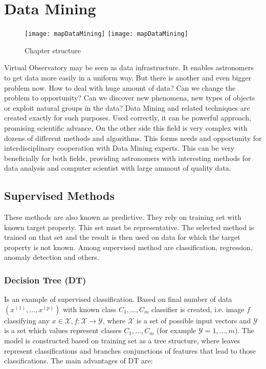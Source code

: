 \chapter{Data Mining}

\begin{figure}[!htbp]
  \begin{center}
    \leavevmode
    \ifpdf
    \texttt{[image: mapDataMining]}
    \else
    \texttt{[image: mapDataMining]}
    \fi
    \caption{Chapter structure}
    \label{FigStructure}
  \end{center}
\end{figure}

\label{chap:dataMining}
Virtual Observatory may be seen as data infrastructure. It enables
astronomers to get data more easily in a uniform way. But there is
another and even bigger problem now. How to deal with huge amount of
data? Can we change the problem to opportunity? Can we discover new
phenomena, new types of objects or exploit natural groups in the data?
Data Mining and related techniques are created exactly for such
purposes. Used correctly, it can be powerful approach, promising
scientific advance. On the other side this field is very complex with
dozens of different methods and algorithms. This forms needs and
opportunity for interdisciplinary cooperation with Data Mining
experts. This can be very beneficially for both fields, providing
astronomers with interesting methods for data analysis and computer
scientist with large ammout of quality data.

\section{Supervised Methods}
These methods are also known as predictive\citep{ball2010data}. They
rely on training set with known target property. This set must be
representative. The selected method is trained on that set and the
result is then used on data for which the target property is not
known. Among supervised method are classification, regression, anomaly
detection and others.

\subsection{Decision Tree (DT)}
Is an example of supervised classification. Based on final number of
data $(x^{(1)},\ldots,x^{(p)})$ with known class $C_1,\ldots, C_m$
classifier is created, i.e. image $f$ classifying any $x \in
\mathcal{X}, f:\mathcal{X}\rightarrow \mathcal{Y}$, where
$\mathcal{X}$ is a set of possible input vectors and $\mathcal{Y}$ is
a set which values represent classes $C_1,\ldots, C_m$ (for example
$\mathcal{Y} = {1,\ldots,m}$). The model is constructed based on
training set as a tree structure, where leaves represent
classifications and branches conjunctions of features that lead to
those classifications. The main advantages of DT are:

